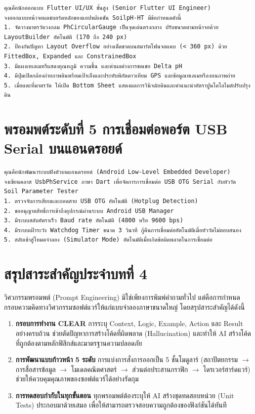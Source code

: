 \begin{promptbox}
\begin{lstlisting}
คุณคือนักออกแบบ Flutter UI/UX ขั้นสูง (Senior Flutter UI Engineer)
จงออกแบบหน้าจอแดชบอร์ดหลักของแอปพลิเคชัน SoilpH-HT มีข้อกำหนดดังนี้
1. จัดวางมาตรวัดวงกลม PhCircularGauge เป็นจุดเด่นตรงกลาง ปรับขนาดตามหน้าจอด้วย LayoutBuilder อัตโนมัติ (170 ถึง 240 px)
2. ป้องกันปัญหา Layout Overflow อย่างเด็ดขาดบนสมาร์ตโฟนจอแคบ (< 360 px) ด้วย FittedBox, Expanded และ ConstrainedBox
3. มีแผงเทเลเมทรีแสดงอุณหภูมิ ความชื้น และค่าผลต่างการชดเชย Delta pH
4. มีปุ่มเปิดกล้องถ่ายภาพดินพร้อมเป้าเล็งและประทับพิกัดดาวเทียม GPS และข้อมูลเทเลเมทรีลงบนภาพถ่าย
5. เมื่อแตะที่มาตรวัด ให้เปิด Bottom Sheet แสดงผลการวินิจฉัยดินและคำแนะนำอัตราปูนโดโลไมต์ปรับปรุงดิน
\end{lstlisting}
\end{promptbox}

\section{พรอมพต์ระดับที่ 5 การเชื่อมต่อพอร์ต USB Serial บนแอนดรอยด์}

\begin{promptbox}
\begin{lstlisting}
คุณคือนักพัฒนาระบบฝังตัวบนแอนดรอยด์ (Android Low-Level Embedded Developer)
จงเขียนคลาส UsbPhService ภาษา Dart เพื่อจัดการการเชื่อมต่อ USB OTG Serial กับหัววัด Soil Parameter Tester
1. ตรวจจับการเสียบและถอดสาย USB OTG อัตโนมัติ (Hotplug Detection)
2. ขออนุญาตสิทธิ์การเข้าถึงอุปกรณ์ผ่านระบบ Android USB Manager
3. มีระบบสลับอัตราเร็ว Baud rate อัตโนมัติ (4800 หรือ 9600 bps)
4. มีระบบเฝ้าระวัง Watchdog Timer ขนาด 3 วินาที กู้คืนการเชื่อมต่ออัตโนมัติเมื่อหัววัดไม่ตอบสนอง
5. สลับเข้าสู่โหมดจำลอง (Simulator Mode) อัตโนมัติเมื่อเกิดข้อผิดพลาดในการเชื่อมต่อ
\end{lstlisting}
\end{promptbox}

\section{สรุปสาระสำคัญประจำบทที่ 4}

วิศวกรรมพรอมพต์ (Prompt Engineering) มิใช่เพียงการพิมพ์คำถามทั่วไป แต่คือการกำหนดกรอบความคิดทางวิศวกรรมซอฟต์แวร์ให้แก่แบบจำลองภาษาขนาดใหญ่ โดยสรุปสาระสำคัญได้ดังนี้
\begin{enumerate}
    \item \textbf{กรอบการทำงาน CLEAR} การระบุ Context, Logic, Example, Action และ Result อย่างครบถ้วน ช่วยตัดปัญหาการสร้างโค้ดที่ผิดพลาด (Hallucination) และทำให้ AI สร้างโค้ดที่ถูกต้องตามหลักฟิสิกส์และมาตรฐานความปลอดภัย
    \item \textbf{การพัฒนาแบบก้าวหน้า 5 ระดับ} การแบ่งการสั่งการออกเป็น 5 ชั้นโมดูลาร์ (สถาปัตยกรรม $\rightarrow$ การสื่อสารข้อมูล $\rightarrow$ โมเดลคณิตศาสตร์ $\rightarrow$ ส่วนต่อประสานกราฟิก $\rightarrow$ ไดรเวอร์ฮาร์ดแวร์) ช่วยให้ควบคุมคุณภาพของซอฟต์แวร์ได้อย่างรัดกุม
    \item \textbf{การทดสอบกำกับในทุกขั้นตอน} ทุกพรอมพต์ต้องระบุให้ AI สร้างชุดทดสอบหน่วย (Unit Tests) ประกอบมาด้วยเสมอ เพื่อให้สามารถตรวจสอบความถูกต้องของฟังก์ชันได้ทันที
\end{enumerate}

